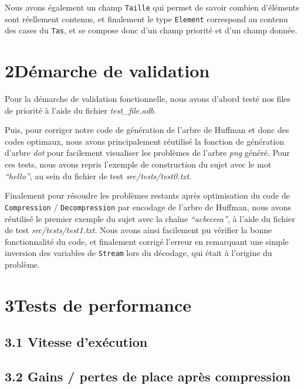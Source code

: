 \documentclass [a4paper,11pt] {report}
\begin{document}
Nous avons également un champ \lstinline!Taille! qui permet de savoir combien d'éléments sont réellement contenus, et finalement le type \lstinline!Element! correspond au contenu des cases du \lstinline!Tas!, et se compose donc d'un champ priorité et d'un champ donnée.





\section* {2\hspace{5mm}Démarche de validation }

Pour la démarche de validation fonctionnelle, nous avons d'abord testé nos files de priorité à l'aide du fichier \textit{test\_file.adb}.

Puis, pour corriger notre code de génération de l'arbre de Huffman et donc des codes optimaux, nous avons principalement réutilisé la fonction de génération d'arbre \textit{dot} pour facilement visualiser les problèmes de l'arbre \textit{png} généré. Pour ces tests, nous avons repris l'exemple de construction du sujet avec le mot \textit{``hello''}, au sein du fichier de test \textit{src/tests/test0.txt}.

Finalement pour résoudre les problèmes restants après optimisation du code de \lstinline!Compression! / \lstinline!Decompression! par encodage de l'arbre de Huffman, nous avons réutilisé le premier exemple du sujet avec la chaîne \textit{``acbeceea''}, à l'aide du fichier de test \textit{src/tests/test1.txt}.
Nous avons ainsi facilement pu vérifier la bonne fonctionnalité du code, et finalement corrigé l'erreur en remarquant une simple inversion des variables de \lstinline!Stream! lors du décodage, qui était à l'origine du problème.


\section* {3\hspace{5mm}Tests de performance }

\subsection* {3.1\hspace{3mm} Vitesse d'exécution}



\subsection* {3.2\hspace{3mm} Gains / pertes de place après compression}
\end{document}
